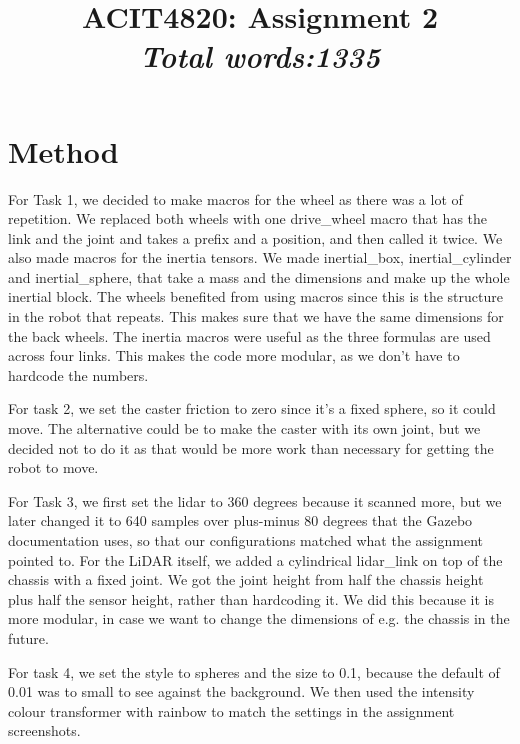\documentclass[conference]{IEEEtran}
\begin{document}
\title{ACIT4820: Assignment 2 \\[4pt] \normalsize \textit{Total words:1335 }}

\author{
     \and
}

\maketitle

\section{Method}
For Task 1, we decided to make macros for the wheel as there was a lot of repetition. We replaced both wheels with one drive\_wheel macro that has the link and the joint and takes a prefix and a position, and then called it twice. We also made macros for the inertia tensors. We made inertial\_box, inertial\_cylinder and inertial\_sphere, that take a mass and the dimensions and make up the whole inertial block. The wheels benefited from using macros since this is the structure in the robot that repeats. This makes sure that we have the same dimensions for the back wheels. The inertia macros were useful as the three formulas are used across four links. This makes the code more modular, as we don't have to hardcode the numbers. 

For task 2, we set the caster friction to zero since it's a fixed sphere, so it could move. The alternative could be to make the caster with its own joint, but we decided not to do it as that would be more work than necessary for getting the robot to move. 

For Task 3, we first set the lidar to 360 degrees because it scanned more, but we later changed it to 640 samples over plus-minus 80 degrees that the Gazebo documentation uses, so that our configurations matched what the assignment pointed to. For the LiDAR itself, we added a cylindrical lidar\_link on top of the chassis with a fixed joint. We got the joint height from half the chassis height plus half the sensor height, rather than hardcoding it. We did this because it is more modular, in case we want to change the dimensions of e.g. the chassis in the future.

For task 4, we set the style to spheres and the size to 0.1, because the default of 0.01 was to small to see against the background. We then used the intensity colour transformer with rainbow to match the settings in the assignment screenshots. 
\end{document}
